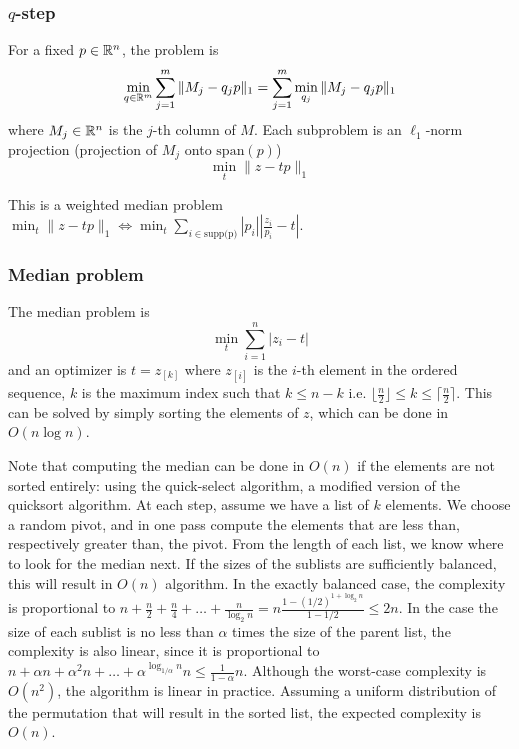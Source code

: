\subsubsection{$q$-step} For a fixed $p \in {\mathbb R}^n$, the problem is
\[
\min_{q \in {\mathbb R}^m} \sum_{j = 1}^m \|M_j - q_jp\|_1 = \sum_{j = 1}^m \min_{q_j} \|M_j - q_jp\|_1
\]
where $M_j \in {\mathbb R}^n$ is the $j$-th column of $M$. Each subproblem is an $\ell_1$-norm projection (projection of $M_j$ onto $\text{span}(p)$)
\[
\min_t \|z - tp\|_1
\]

This is a weighted median problem $\min_t \|z - tp\|_1 \Leftrightarrow \min_t \sum_{i \in \text{supp(p)}} |p_i| \left| \frac{z_i}{p_i} - t \right| $.

\subsubsection{Median problem}
The median problem is
\[
\min_t \sum_{i = 1}^n |z_i - t|
\]
and an optimizer is $t = z_{[k]}$ where $z_{[i]}$ is the $i$-th element in the ordered sequence, $k$ is the maximum index such that $k \leq n-k$ i.e. $\lfloor \frac{n}{2} \rfloor \leq k \leq \lceil \frac{n}{2} \rceil$. This can be solved by simply sorting the elements of $z$, which can be done in $O(n \log n)$.

Note that computing the median can be done in $O(n)$ if the elements are not sorted entirely: using the quick-select algorithm, a modified version of the quicksort algorithm. At each step, assume we have a list of $k$ elements. We choose a random pivot, and in one pass compute the elements that are less than, respectively greater than, the pivot. From the length of each list, we know where to look for the median next. If the sizes of the sublists are sufficiently balanced, this will result in $O(n)$ algorithm. In the exactly balanced case, the complexity is proportional to $n + \frac{n}{2} + \frac{n}{4} + \dots + \frac{n}{\log_2 n} = n\frac{1-(1/2)^{1 + \log_2 n}}{1 - 1/2} \leq 2n$. In the case the size of each sublist is no less than $\alpha$ times the size of the parent list, the complexity is also linear, since it is proportional to $n + \alpha n + \alpha^2 n + \dots + \alpha^{\log_{1/\alpha} n} n \leq \frac{1}{1 - \alpha}n$. 
Although the worst-case complexity is $O(n^2)$, the algorithm is linear in practice. Assuming a uniform distribution of the permutation that will result in the sorted list, the expected complexity is $O(n)$.


